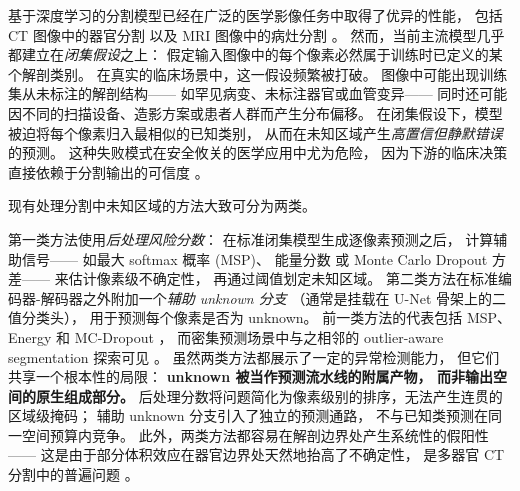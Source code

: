 \documentclass[3p,twocolumn,authoryear]{elsarticle}
\begin{document}
 
基于深度学习的分割模型已经在广泛的医学影像任务中取得了优异的性能，
包括 CT 图像中的器官分割
以及 MRI 图像中的病灶分割
\cite{zhao2023efficientmulti,zeineldin2022multimodalcnn}。
然而，当前主流模型几乎都建立在\emph{闭集假设}之上：
假定输入图像中的每个像素必然属于训练时已定义的某个解剖类别。
在真实的临床场景中，这一假设频繁被打破。
图像中可能出现训练集从未标注的解剖结构——
如罕见病变、未标注器官或血管变异——
同时还可能因不同的扫描设备、造影方案或患者人群而产生分布偏移。
在闭集假设下，模型被迫将每个像素归入最相似的已知类别，
从而在未知区域产生\emph{高置信但静默错误}的预测。
这种失败模式在安全攸关的医学应用中尤为危险，
因为下游的临床决策直接依赖于分割输出的可信度
\cite{kompa2021secondopinion,li2025evaluationuncertainty,miranda2024exploringtransformer}。
 
 
现有处理分割中未知区域的方法大致可分为两类。
 
第一类方法使用\emph{后处理风险分数}：
在标准闭集模型生成逐像素预测之后，
计算辅助信号——
如最大 softmax 概率 (MSP)、
能量分数
或 Monte Carlo Dropout 方差——
来估计像素级不确定性，
再通过阈值划定未知区域。
第二类方法在标准编码器-解码器之外附加一个\emph{辅助 unknown 分支}
（通常是挂载在 U-Net 骨架上的二值分类头），
用于预测每个像素是否为 unknown。
前一类方法的代表包括 MSP、Energy 和 MC-Dropout
\cite{hendrycks2017baselinedetecting,liu2020energyout,gal2016dropoutbayesian}，
而密集预测场景中与之相邻的 outlier-aware segmentation 探索可见
\cite{grcic2023advantagesmask}。
虽然两类方法都展示了一定的异常检测能力，
但它们共享一个根本性的局限：
\textbf{unknown 被当作预测流水线的附属产物，
而非输出空间的原生组成部分。}
后处理分数将问题简化为像素级别的排序，无法产生连贯的区域级掩码；
辅助 unknown 分支引入了独立的预测通路，
不与已知类预测在同一空间预算内竞争。
此外，两类方法都容易在解剖边界处产生系统性的假阳性——
这是由于部分体积效应在器官边界处天然地抬高了不确定性，
是多器官 CT 分割中的普遍问题
\cite{li2020superpixelguided,yeung2021incorporatingboundary,mukul2020uncertaintygraph,hassan2024udbrnetnovel}。
 
\end{document}
